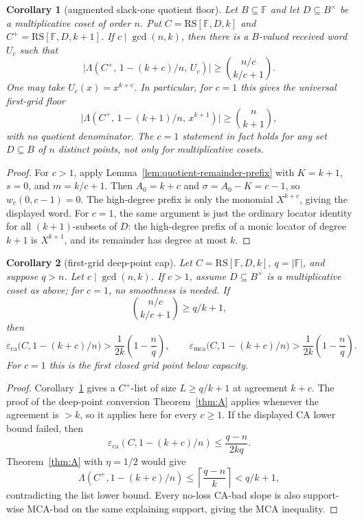 \documentclass[11pt]{article}
\newtheorem{corollary}[corollary]{Corollary}
\theoremstyle{definition}
\theoremstyle{remark}
\newcommand{\F}{\mathbb{F}}
\newcommand{\B}{B}
\newcommand{\RS}{\mathrm{RS}}
\newcommand{\eca}{\varepsilon_{\mathrm{ca}}}
\newcommand{\emca}{\varepsilon_{\mathrm{mca}}}
\newcommand{\Lst}{\Lambda}
\begin{document}
\begin{corollary}[augmented slack-one quotient floor]
\label{cor:augmented-slack-one}
Let $\B\subseteq\F$ and let $D\subseteq\B^\times$ be a multiplicative coset
of order $n$.  Put $C=\RS[\F,D,k]$ and $C^+=\RS[\F,D,k+1]$.  If
$c\mid\gcd(n,k)$, then there is a $\B$-valued received word $U_c$ such that
\[
        \bigl|\Lst(C^+,\,1-(k+c)/n,\,U_c)\bigr|
        \ge
        \binom{n/c}{k/c+1} .
\]
One may take $U_c(x)=x^{k+c}$.  In particular, for $c=1$ this gives the
universal first-grid floor
\[
        \bigl|\Lst(C^+,\,1-(k+1)/n,\,x^{k+1})\bigr|
        \ge
        \binom n{k+1},
\]
with no quotient denominator.  The $c=1$ statement in fact holds for any set
$D\subseteq\B$ of $n$ distinct points, not only for multiplicative cosets.
\end{corollary}

\begin{proof}
For $c>1$, apply Lemma~\ref{lem:quotient-remainder-prefix} with $K=k+1$,
$s=0$, and $m=k/c+1$.  Then $A_0=k+c$ and $\sigma=A_0-K=c-1$, so
$w_c(0,c-1)=0$.  The high-degree prefix is only the monomial $X^{k+c}$, giving
the displayed word.  For $c=1$, the same argument is just the ordinary locator
identity for all $(k+1)$-subsets of $D$: the high-degree prefix of a monic
locator of degree $k+1$ is $X^{k+1}$, and its remainder has degree at most $k$.
\end{proof}

\begin{corollary}[first-grid deep-point cap]
\label{cor:first-grid-cap}
Let $C=\RS[\F,D,k]$, $q=|\F|$, and suppose $q>n$.  Let
$c\mid\gcd(n,k)$.  If $c>1$, assume $D\subseteq\B^\times$ is a
multiplicative coset as above; for $c=1$, no smoothness is needed.  If
\[
        \binom{n/c}{k/c+1}\ge q/k+1,
\]
then
\[
        \eca\bigl(C,1-(k+c)/n\bigr)
        >\frac1{2k}\left(1-\frac nq\right),
        \qquad
        \emca\bigl(C,1-(k+c)/n\bigr)
        >\frac1{2k}\left(1-\frac nq\right).
\]
For $c=1$ this is the first closed grid point below capacity.
\end{corollary}

\begin{proof}
Corollary~\ref{cor:augmented-slack-one} gives a $C^+$-list of size
$L\ge q/k+1$ at agreement $k+c$.  The proof of the deep-point conversion
Theorem~\ref{thm:A} applies whenever the agreement is $>k$, so it applies here
for every $c\ge1$.  If the displayed CA lower bound failed, then
\[
        \eca(C,1-(k+c)/n)\le \frac{q-n}{2kq}.
\]
Theorem~\ref{thm:A} with $\eta=1/2$ would give
\[
        \Lst(C^+,1-(k+c)/n)
        \le
        \left\lceil \frac{q-n}{k}\right\rceil
        < q/k+1,
\]
contradicting the list lower bound.  Every no-loss CA-bad slope is also
support-wise MCA-bad on the same explaining support, giving the MCA inequality.
\end{proof}
\end{document}
